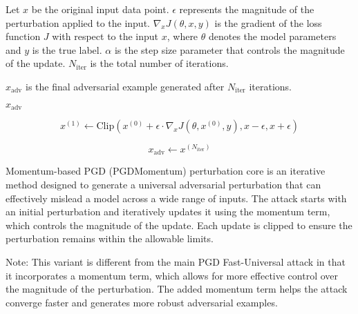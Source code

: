 Let $x$ be the original input data point.
\( \epsilon \) represents the magnitude of the perturbation applied to the input.
\( \nabla_x J(\theta, x, y) \) is the gradient of the loss function \( J \) with respect to the input \( x \), where \( \theta \) denotes the model parameters and \( y \) is the true label.
\( \alpha \) is the step size parameter that controls the magnitude of the update.
\( N_{\text{iter}} \) is the total number of iterations.

\( x_{\text{adv}} \) is the final adversarial example generated after $N_{\text{iter}}$ iterations.

\begin{algorithm}
    \( x_{\text{adv}} \)

    \[
    x^{(1)} \leftarrow \text{Clip}\left(x^{(0)} + \epsilon \cdot \nabla_x J(\theta, x^{(0)}, y), x - \epsilon, x + \epsilon\right)
    \]


    \[
    x_{\text{adv}} \leftarrow x^{(N_{\text{iter}})}
    \]
\end{algorithm}

Momentum-based PGD (PGDMomentum) perturbation core is an iterative method designed to generate a universal adversarial perturbation that can effectively mislead a model across a wide range of inputs. The attack starts with an initial perturbation and iteratively updates it using the momentum term, which controls the magnitude of the update. Each update is clipped to ensure the perturbation remains within the allowable limits.

Note: This variant is different from the main PGD Fast-Universal attack in that it incorporates a momentum term, which allows for more effective control over the magnitude of the perturbation. The added momentum term helps the attack converge faster and generates more robust adversarial examples.